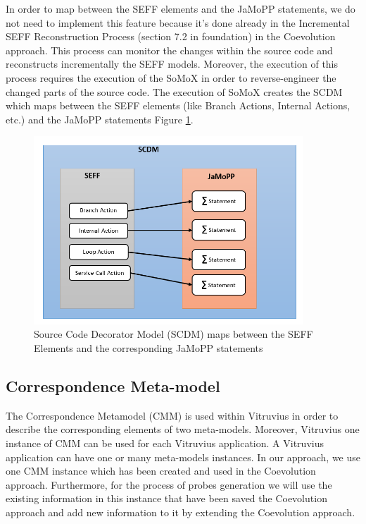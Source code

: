 In order to map between the SEFF elements and the JaMoPP statements, we do not need to implement this feature because it's done already in the Incremental SEFF Reconstruction Process (section 7.2 in foundation) in the Coevolution approach. This process can monitor the changes within the source code and reconstructs incrementally the SEFF models. Moreover, the execution of this process requires the execution of the SoMoX in order to reverse-engineer the changed parts of the source code. The execution of SoMoX creates the SCDM which maps between the SEFF elements (like Branch Actions, Internal Actions, etc.) and the JaMoPP statements Figure \ref{fig:seff jamopp}.


\begin{figure}[h]
\centering
\includegraphics[width=0.9\textwidth]{figures/seff_jamopp}
\caption{Source Code Decorator Model (SCDM) maps between the SEFF Elements and the corresponding JaMoPP statements}
\label{fig:seff jamopp}
\end{figure}



\subsection{Correspondence Meta-model}
\label{sec:Correspondence Meta-model}
The Correspondence Metamodel (CMM) is used within Vitruvius in order to describe the corresponding elements of two meta-models. Moreover, Vitruvius one instance of CMM can be used for each Vitruvius application. A Vitruvius application can have one or many meta-models instances.  In our approach, we use one CMM instance which has been created and used in the Coevolution approach. Furthermore, for the process of probes generation we will use the existing information in this instance that have been saved the Coevolution approach and add new information to it by extending the Coevolution approach.\\

